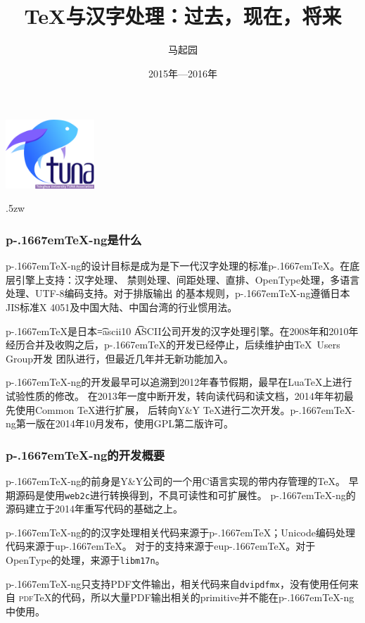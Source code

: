\documentclass[dvipdfmx]{beamer}
\newcommand{\pTeX}{p\kern-.1667em\TeX}
\newcommand{\ptexng}{\pTeX-ng}
\begin{document}
\title{\bf \TeX 与汉字处理：过去，现在，将来}
\author{马起园}
\date{2015年—2016年}
\begin{frame}
\maketitle
\begin{center}
\includegraphics[bb=0 0 255 197, width=9em]{tuna-logo.png}
\end{center}
\end{frame}
%
\parskip.5zw
%
\begin{frame}[fragile]
\frametitle{\ptexng 是什么}
\ptexng 的设计目标是成为是下一代汉字处理的标准\pTeX。在底层引擎上支持：汉字处理、
禁则处理、间距处理、直排、OpenType处理，多语言处理、UTF-8编码支持。对于排版输出
的基本规则，\ptexng 遵循日本JIS标准X 4051及中国大陆、中国台湾的行业惯用法。

\pTeX 是日本{\font\t=ascii10 \t ASCII}公司开发的汉字处理引擎。在2008年和2010年
经历合并及收购之后，\pTeX 的开发已经停止，后续维护由\TeX\ Users Group开发
团队进行，但最近几年并无新功能加入。

\ptexng 的开发最早可以追溯到2012年春节假期，最早在Lua\TeX 上进行试验性质的修改。
在2013年一度中断开发，转向读代码和读文档，2014年年初最先使用Common \TeX 进行扩展，
后转向Y\&Y \TeX 进行二次开发。\ptexng 第一版在2014年10月发布，使用GPL第二版许可。
\end{frame}
%
\begin{frame}[fragile]
\frametitle{\ptexng 的开发概要}

\ptexng 的前身是Y\&Y公司的一个用C语言实现的带内存管理的\TeX。
早期源码是使用{\texttt{web2c}}进行转换得到，不具可读性和可扩展性。
\ptexng 的源码建立于2014年重写代码的基础之上。

\ptexng 的的汉字处理相关代码来源于\pTeX；Unicode编码处理代码来源于u\pTeX。
对于的支持来源于eu\pTeX。对于OpenType的处理，来源于\texttt{libm17n}。

\ptexng 只支持PDF文件输出，相关代码来自\texttt{dvipdfmx}，没有使用任何来自
{\textsc{pdf}\TeX}的代码，所以大量PDF输出相关的primitive并不能在\ptexng
中使用。
\end{frame}
%
\end{document}
